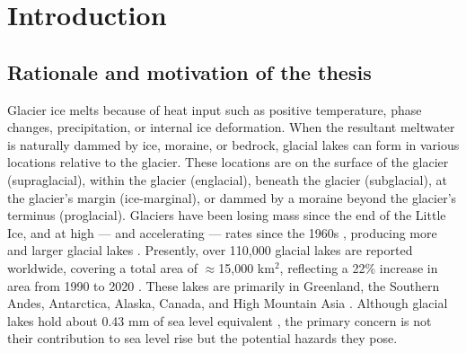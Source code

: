 \chapter{Introduction}
\label{ch:introduction}


\section{Rationale and motivation of the thesis}






Glacier ice melts because of heat input such as positive temperature, phase changes, precipitation, or internal ice deformation. When the resultant meltwater is naturally dammed by ice, moraine, or bedrock, glacial lakes can form in various locations relative to the glacier. These locations are on the surface of the glacier (supraglacial), within the glacier (englacial), beneath the glacier (subglacial), at the glacier's margin (ice-marginal), or dammed by a moraine beyond the glacier's terminus (proglacial). Glaciers have been losing mass since the end of the Little Ice, and at high — and accelerating — rates since the 1960s \cite{Huggonet2022,Zemp2019}, producing more and larger glacial lakes \cite{Zhang&al2024}. Presently, over 110,000 glacial lakes are reported worldwide, covering a total area of  $\approx$15,000 km$^2$, reflecting a 22\% increase in area from 1990 to 2020 \citep{Zhang&al2024}. These lakes are primarily in Greenland, the Southern Andes, Antarctica, Alaska, Canada, and High Mountain Asia \citep{Shugar&al2020}. Although glacial lakes hold about 0.43 mm of sea level equivalent \cite{Shugar&al2020}, the primary concern is not their contribution to sea level rise but the potential hazards they pose.

